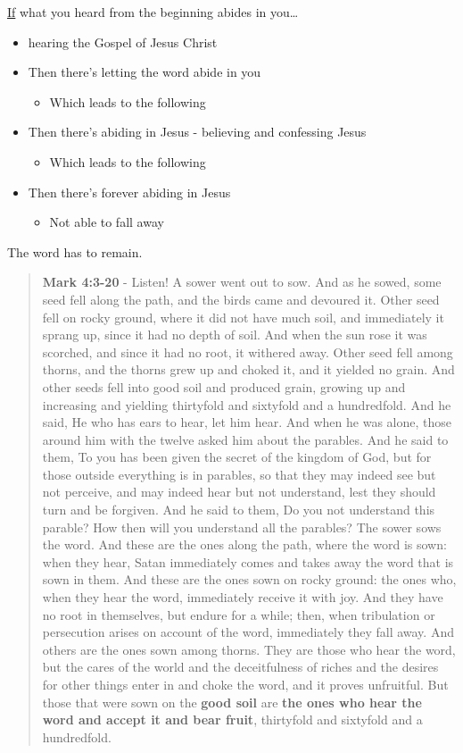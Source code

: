 \documentclass[11pt]{article}
\begin{document}
\uline{If} what you heard from the beginning abides in you\ldots{}

\begin{itemize}
\item hearing the Gospel of Jesus Christ
\item Then there's letting the word abide in you
\begin{itemize}
\item Which leads to the following
\end{itemize}
\item Then there's abiding in Jesus - believing and confessing Jesus
\begin{itemize}
\item Which leads to the following
\end{itemize}
\item Then there's forever abiding in Jesus
\begin{itemize}
\item Not able to fall away
\end{itemize}
\end{itemize}

The word has to remain.

\begin{quote}
\textbf{Mark 4:3-20} - Listen! A sower went out to sow.  And as he sowed, some seed fell along the path, and the birds came and devoured it.  Other seed fell on rocky ground, where it did not have much soil, and immediately it sprang up, since it had no depth of soil.  And when the sun rose it was scorched, and since it had no root, it withered away.  Other seed fell among thorns, and the thorns grew up and choked it, and it yielded no grain.  And other seeds fell into good soil and produced grain, growing up and increasing and yielding thirtyfold and sixtyfold and a hundredfold.  And he said, He who has ears to hear, let him hear.  And when he was alone, those around him with the twelve asked him about the parables.  And he said to them, To you has been given the secret of the kingdom of God, but for those outside everything is in parables, so that they may indeed see but not perceive, and may indeed hear but not understand, lest they should turn and be forgiven.  And he said to them, Do you not understand this parable? How then will you understand all the parables?  The sower sows the word.  And these are the ones along the path, where the word is sown: when they hear, Satan immediately comes and takes away the word that is sown in them.  And these are the ones sown on rocky ground: the ones who, when they hear the word, immediately receive it with joy.  And they have no root in themselves, but endure for a while; then, when tribulation or persecution arises on account of the word, immediately they fall away.  And others are the ones sown among thorns. They are those who hear the word, but the cares of the world and the deceitfulness of riches and the desires for other things enter in and choke the word, and it proves unfruitful.  But those that were sown on the \textbf{good soil} are \textbf{the ones who hear the word and accept it and bear fruit}, thirtyfold and sixtyfold and a hundredfold.
\end{quote}
\end{document}
